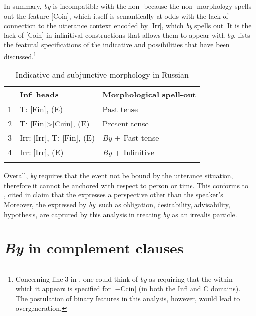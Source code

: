 \documentclass[output=paper,modfonts,newtxmath,hidelinks,]{langscibook}
\begin{document}
In summary, \textit{by} is incompatible with the non- because the non- morphology spells out the feature [Coin], which itself is semantically at odds with the lack of connection to the utterance context encoded by [Irr], which \textit{by} spells out. It is the lack of [Coin] in infinitival constructions that allows them to appear with \textit{by}.  lists the featural specifications of the indicative and  possibilities that have been discussed.\footnote{\label{10:fn4}Concerning line 3 in , one could think of \textit{by} as requiring that the  within which it appears is specified for [$-$Coin] (in both the Infl and C domains). The postulation of binary features in this analysis, however, would lead to overgeneration.}

\begin{table}[h]
\caption{Indicative and subjunctive morphology in Russian}
\label{10:table2}
\begin{tabularx}{.80\textwidth}{rlX}
\lsptoprule
&\textbf{Infl heads} & \textbf{Morphological spell-out}\\
\midrule
1&T: [Fin], (E) & Past tense\\
2&T: [Fin]>[Coin], (E) & Present tense\\
3&Irr: [Irr], T: [Fin], (E) & \textit{By} + Past tense\\
4&Irr: [Irr], (E) & \textit{By} + Infinitive\\
\lspbottomrule
\end{tabularx}
\label{10:table:table_2}
\end{table}

Overall, \textit{by} requires that the event not be bound by the utterance situation, therefore it cannot be anchored with respect to person or time. This conforms to , cited in \citet[10]{Cowper2002} claim that the  expresses a perspective other than the speaker’s. Moreover, the  expressed by \textit{by}, such as obligation, desirability, advisability, hypothesis, are captured by this analysis in treating \textit{by} as an irrealis particle.



\section{\textit{By} in complement clauses}\label{10:s5}
\end{document}
